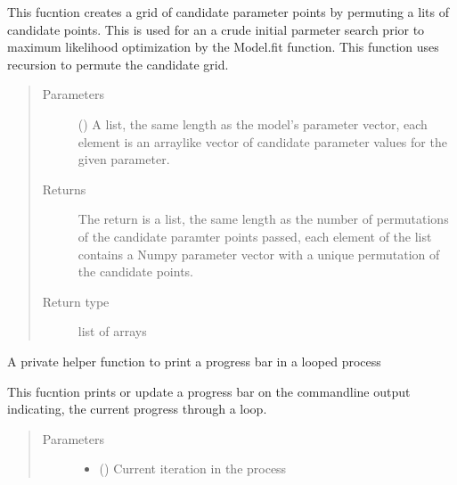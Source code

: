 \documentclass[letterpaper,10pt,english,openany,oneside]{sphinxmanual}
\begin{document}
\begin{fulllineitems}
\begin{fulllineitems}
This fucntion creates a grid of candidate parameter points by permuting a lits of candidate
points. This is used for an a crude initial parmeter search prior to maximum likelihood
optimization by the Model.fit function. This function uses recursion to permute the candidate
grid.
\begin{quote}\begin{description}
\item[{Parameters}] \leavevmode
{} () \textendash{} A list, the same length as the model’s
parameter vector, each element is an array\sphinxhyphen{}like vector of candidate parameter
values for the given parameter.

\item[{Returns}] \leavevmode
The return is a list, the same length as the number of permutations of
the candidate paramter points passed, each element of the list contains a Numpy parameter
vector with a unique permutation of the candidate points.

\item[{Return type}] \leavevmode
list of arrays

\end{description}\end{quote}

\end{fulllineitems}


\begin{fulllineitems}
\label{\detokenize{nloed:nloed.model.Model.__progress_bar}}
A private helper function to print a progress bar in a looped process

This fucntion prints or update a progress bar on the commandline output indicating, the
current progress through a loop.
\begin{quote}\begin{description}
\item[{Parameters}] \leavevmode\begin{itemize}
\item {} 
 () \textendash{} Current iteration in the process


\end{itemize}
\end{description}
\end{quote}
\end{fulllineitems}
\end{fulllineitems}
\end{document}
